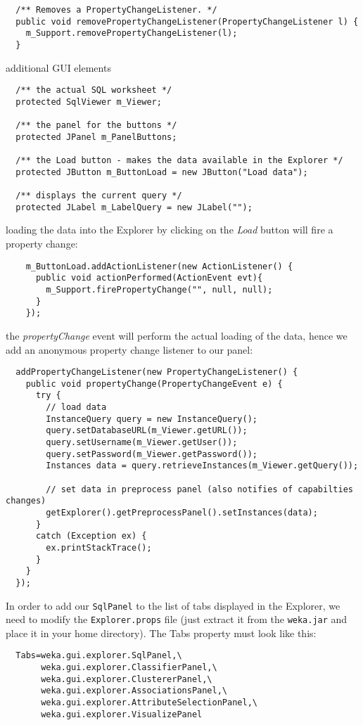 \begin{tight_itemize}
\begin{verbatim}
  /** Removes a PropertyChangeListener. */
  public void removePropertyChangeListener(PropertyChangeListener l) {
    m_Support.removePropertyChangeListener(l);
  }
  \end{verbatim}

  \newpage
  \item additional GUI elements
  \begin{verbatim}
  /** the actual SQL worksheet */
  protected SqlViewer m_Viewer;

  /** the panel for the buttons */
  protected JPanel m_PanelButtons;

  /** the Load button - makes the data available in the Explorer */
  protected JButton m_ButtonLoad = new JButton("Load data");

  /** displays the current query */
  protected JLabel m_LabelQuery = new JLabel("");
  \end{verbatim}

  \item loading the data into the Explorer by clicking on the \textit{Load}
button will fire a property change:
  \begin{verbatim}
    m_ButtonLoad.addActionListener(new ActionListener() {
      public void actionPerformed(ActionEvent evt){
        m_Support.firePropertyChange("", null, null);
      }
    });
  \end{verbatim}

  \item the \textit{propertyChange} event will perform the actual loading of the
data, hence we add an anonymous property change listener to our panel:
  \begin{verbatim}
  addPropertyChangeListener(new PropertyChangeListener() {
    public void propertyChange(PropertyChangeEvent e) {
      try {
        // load data
        InstanceQuery query = new InstanceQuery();
        query.setDatabaseURL(m_Viewer.getURL());
        query.setUsername(m_Viewer.getUser());
        query.setPassword(m_Viewer.getPassword());
        Instances data = query.retrieveInstances(m_Viewer.getQuery());

        // set data in preprocess panel (also notifies of capabilties changes)
        getExplorer().getPreprocessPanel().setInstances(data);
      }
      catch (Exception ex) {
        ex.printStackTrace();
      }
    }
  });
  \end{verbatim}

  \item In order to add our \texttt{SqlPanel} to the list of tabs displayed in
the Explorer, we need to modify the \texttt{Explorer.props} file (just extract
it from the \texttt{weka.jar} and place it in your home directory). The Tabs
property must look like this:
  \begin{verbatim}
  Tabs=weka.gui.explorer.SqlPanel,\
       weka.gui.explorer.ClassifierPanel,\
       weka.gui.explorer.ClustererPanel,\
       weka.gui.explorer.AssociationsPanel,\
       weka.gui.explorer.AttributeSelectionPanel,\
       weka.gui.explorer.VisualizePanel
  \end{verbatim}
\end{tight_itemize}

